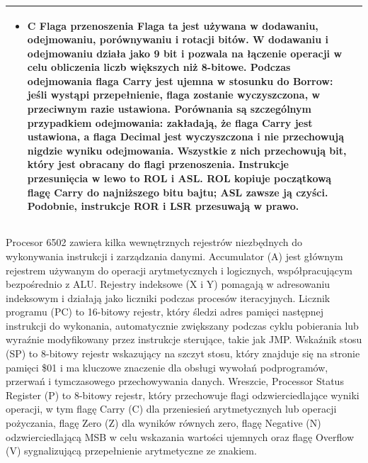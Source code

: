 \begin{longtable}{|p{5cm}|p{11cm}|}
\begin{itemize}
\item \textbf{C Flaga przenoszenia}
Flaga ta jest używana w dodawaniu, odejmowaniu, porównywaniu i rotacji bitów. W dodawaniu i odejmowaniu działa jako 9 bit i pozwala na łączenie operacji w celu obliczenia liczb większych niż 8-bitowe. Podczas odejmowania flaga Carry jest ujemna w stosunku do Borrow: jeśli wystąpi przepełnienie, flaga zostanie wyczyszczona, w przeciwnym razie ustawiona. Porównania są szczególnym przypadkiem odejmowania: zakładają, że flaga Carry jest ustawiona, a flaga Decimal jest wyczyszczona i nie przechowują nigdzie wyniku odejmowania. Wszystkie z nich przechowują bit, który jest obracany do flagi przenoszenia. Instrukcje przesunięcia w lewo to ROL i ASL. ROL kopiuje początkową flagę Carry do najniższego bitu bajtu; ASL zawsze ją czyści. Podobnie, instrukcje ROR i LSR przesuwają w prawo.

\end{itemize} \\ \hline

\end{longtable}


Procesor 6502 zawiera kilka wewnętrznych rejestrów niezbędnych do wykonywania instrukcji i zarządzania danymi. Accumulator (A) jest głównym rejestrem używanym do operacji arytmetycznych i logicznych, współpracującym bezpośrednio z ALU. Rejestry indeksowe (X i Y) pomagają w adresowaniu indeksowym i działają jako liczniki podczas procesów iteracyjnych. Licznik programu (PC) to 16-bitowy rejestr, który śledzi adres pamięci następnej instrukcji do wykonania, automatycznie zwiększany podczas cyklu pobierania lub wyraźnie modyfikowany przez instrukcje sterujące, takie jak JMP. Wskaźnik stosu (SP) to 8-bitowy rejestr wskazujący na szczyt stosu, który znajduje się na stronie pamięci \$01 i ma kluczowe znaczenie dla obsługi wywołań podprogramów, przerwań i tymczasowego przechowywania danych. Wreszcie, Processor Status Register (P) to 8-bitowy rejestr, który przechowuje flagi odzwierciedlające wyniki operacji, w tym flagę Carry (C) dla przeniesień arytmetycznych lub operacji pożyczania, flagę Zero (Z) dla wyników równych zero, flagę Negative (N) odzwierciedlającą MSB w celu wskazania wartości ujemnych oraz flagę Overflow (V) sygnalizującą przepełnienie arytmetyczne ze znakiem.

